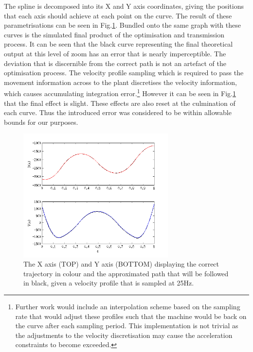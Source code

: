 The spline is decomposed into its X and Y axis coordinates, giving the positions that each axis should achieve at each point on the curve. The result of these parametrisations can be seen in Fig.\ref{fig:xy_s}. Bundled onto the same graph with these curves is the simulated final product of the optimisation and transmission process. It can be seen that the black curve representing the final theoretical output at this level of zoom has an error that is nearly imperceptible. The deviation that is discernible from the correct path is not an artefact of the optimisation process. The velocity profile sampling which is required to pass the movement information across to the plant discretises the velocity information, which causes accumulating integration error.\footnote{Further work would include an interpolation scheme based on the sampling rate that would adjust these profiles such that the machine would be back on the curve after each sampling period. This implementation is not trivial as the adjustments to the velocity discretisation may cause the acceleration constraints to become exceeded.} However it can be seen in Fig.\ref{fig:xy_s} that the final effect is slight. These effects are also reset at the culmination of each curve. Thus the introduced error was considered to be within allowable bounds for our purposes.

\begin{figure}[htbp]
\centering
\includegraphics[width=0.7\textwidth]{figures/optimisation/xy_s.png}
\caption[Indexed curve position and theoretical final path]{
The X axis (TOP) and Y axis (BOTTOM) displaying the correct trajectory in colour and the approximated path that will be followed in black, given a velocity profile that is sampled at 25Hz.
\label{fig:xy_s}}
\end{figure} 

